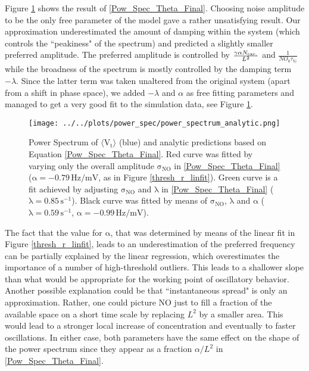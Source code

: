 \documentclass[10pt,a4paper]{article}
\begin{document}
Figure \ref{Pow_Spec_Theta_vs_Analytic} shows the result of \eqref{Pow_Spec_Theta_Final}. Choosing noise amplitude to be the only free parameter of the model gave a rather unsatisfying result. Our approximation underestimated the amount of damping within the system (which controls the ``peakiness" of the spectrum) and predicted a slightly smaller preferred amplitude. The preferred amplitude is controlled by $\frac{\gamma \alpha N_{\rm exc.}}{L^2}$ and $\frac{1}{NO_0\tau_{V_t}}$ while the broadness of the spectrum is mostly controlled by the damping term $-\lambda$. Since the latter term was taken unaltered from the original system (apart from a shift in phase space), we added $-\lambda$ and $\alpha$ as free fitting parameters and managed to get a very good fit to the simulation data, see Figure \ref{Pow_Spec_Theta_vs_Analytic}.   
\begin{figure}
\begin{center}
\texttt{[image: ../../plots/power\_spec/power\_spectrum\_analytic.png]}
\end{center}
\caption[Power Spectrum of $\mathrm{\langle V_t \rangle}$ and analytic predictions]{Power Spectrum of $\mathrm{\langle V_t \rangle}$ (blue) and analytic predictions based on Equation \eqref{Pow_Spec_Theta_Final}. Red curve was fitted by varying only the overall amplitude $\mathrm{\sigma_{NO}}$ in \eqref{Pow_Spec_Theta_Final} ($\mathrm{\alpha = -0.79 \,Hz/mV}$, as in Figure \ref{thresh_r_linfit}). Green curve is a fit achieved by adjusting $\mathrm{\sigma_{NO}}$ and $\mathrm{\lambda}$ in \eqref{Pow_Spec_Theta_Final} ($\mathrm{\lambda = 0.85 \,s^{-1}}$). Black curve was fitted by means of $\mathrm{\sigma_{NO}}$, $\mathrm{\lambda}$ and $\mathrm{\alpha}$ ($\mathrm{\lambda = 0.59 \,s^{-1}}$, $\mathrm{\alpha=-0.99 \,Hz/mV}$).}
\label{Pow_Spec_Theta_vs_Analytic}
\end{figure}
The fact that the value for $\mathrm{\alpha}$, that was determined by means of the linear fit in Figure \ref{thresh_r_linfit}, leads to an underestimation of the preferred frequency can be partially explained by the linear regression, which overestimates the importance of a number of high-threshold outliers. This leads to a shallower slope than what would be appropriate for the working point of oscillatory behavior. Another possible explanation could be that ``instantaneous spread" is only an approximation. Rather, one could picture NO just to fill a fraction of the available space on a short time scale by replacing $L^2$ by a smaller area. This would lead to a stronger local increase of concentration and eventually to faster oscillations. In either case, both parameters have the same effect on the shape of the power spectrum since they appear as a fraction $\alpha/L^2$ in \eqref{Pow_Spec_Theta_Final}. 
\end{document}

